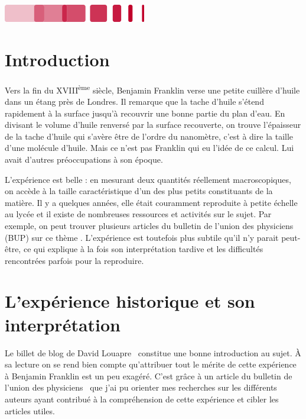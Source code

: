 \documentclass[12pt,a4paper]{article}
\begin{document}
\vfill

\hfill
\includegraphics[scale=1]{logo_bottom.png}

\thispagestyle{empty}

\newpage

\tableofcontents
\newpage

\section*{Introduction}

Vers la fin du XVIII\textsuperscript{ème} siècle, Benjamin Franklin verse une petite cuillère d'huile dans un étang près de Londres.
Il remarque que la tache d'huile s'étend rapidement à la surface jusqu'à recouvrir une bonne partie du plan d'eau.
En divisant le volume d'huile renversé par la surface recouverte, on trouve l'épaisseur de la tache d'huile qui s'avère être de l'ordre du nanomètre, c'est à dire la taille d'une molécule d'huile.
Mais ce n'est pas Franklin qui eu l'idée de ce calcul.
Lui avait d'autres préoccupations à son époque.

L'expérience est belle : en mesurant deux quantités réellement macroscopiques, on accède à la taille caractéristique d'un des plus petits constituants de la matière.
Il y a quelques années, elle était couramment reproduite à petite échelle au lycée et il existe de nombreuses ressources et activités sur le sujet.
Par exemple, on peut trouver plusieurs articles du bulletin de l'union des physiciens (BUP) sur ce thème \cite{Carron1992, Schwob2000, Bacciochini2002, Serra2002}.
L'expérience est toutefois plus subtile qu'il n'y parait peut-être, ce qui explique à la fois son interprétation tardive et les difficultés rencontrées parfois pour la reproduire.

\section{L'expérience historique et son interprétation}

Le billet de blog de David Louapre~\cite{Louapre2012} constitue une bonne introduction au sujet.
À sa lecture on se rend bien compte qu'attribuer tout le mérite de cette expérience à Benjamin Franklin est un peu exagéré.
C'est grâce à un article du bulletin de l'union des physiciens~\cite{Bolmont2001} que j'ai pu orienter mes recherches sur les différents auteurs ayant contribué à la compréhension de cette expérience et cibler les articles utiles.
\end{document}
